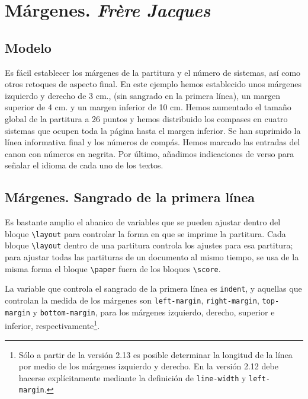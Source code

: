 \section{Márgenes. \emph{Frère Jacques}}


\subsection{Modelo}

Es fácil establecer los márgenes de la partitura y el número de
sistemas, así como otros retoques de aspecto final. En este ejemplo
hemos establecido unos márgenes izquierdo y derecho de 3 cm., (sin
sangrado en la primera línea), un margen superior de 4 cm. y un margen
inferior de 10 cm.  Hemos aumentado el tamaño global de la partitura a
26 puntos y hemos distribuido los compases en cuatro sistemas que
ocupen toda la página hasta el margen inferior.  Se han suprimido la
línea informativa final y los números de compás.  Hemos marcado las
entradas del canon con números en negrita.  Por último, añadimos
indicaciones de verso para señalar el idioma de cada uno de los
textos.

\bigskip
\begin{center}
\end{center}
\bigskip



\subsection{Márgenes.  Sangrado de la primera línea}

Es bastante amplio el abanico de variables que se pueden ajustar
dentro del bloque \verb+\layout+ para controlar la forma en que se
imprime la partitura.  Cada bloque \verb+\layout+ dentro de una
partitura controla los ajustes para esa partitura; para ajustar todas
las partituras de un documento al mismo tiempo, se usa de la misma
forma el bloque \verb+\paper+ fuera de los bloques \verb+\score+.

La variable que controla el sangrado de la primera línea es
\verb+indent+, y aquellas que controlan la medida de los márgenes son
\verb+left-margin+, \verb+right-margin+, \verb+top-margin+ y
\verb+bottom-margin+, para los márgenes izquierdo, derecho, superior e
inferior, respectivamente\footnote{Sólo a partir de la versión 2.13 es
  posible determinar la longitud de la línea por medio de los márgenes
  izquierdo y derecho.  En la versión 2.12 debe hacerse explícitamente
  mediante la definición de \texttt{line-width} y
  \texttt{left-margin}.}.

